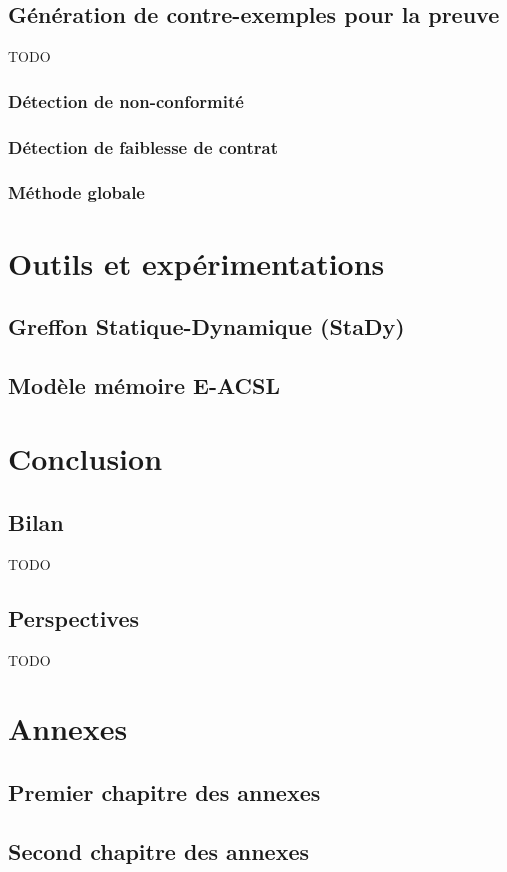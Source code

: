 \documentclass[french]{spimufcphdthesis}
\begin{document}
\chapter{Génération de contre-exemples pour la preuve}

TODO

\section{Détection de non-conformité}
\section{Détection de faiblesse de contrat}
\section{Méthode globale}





\part{Outils et expérimentations}


\chapter{Greffon Statique-Dynamique (StaDy)}
\label{sec:stady}



\chapter{Modèle mémoire E-ACSL}
\label{sec:eacsl}



\part{Conclusion}


\chapter{Bilan}


TODO


\chapter{Perspectives}


TODO



\backmatter




\listoffigures
\listoftables
\listofdefinitions

\appendix
\part{Annexes}

\chapter{Premier chapitre des annexes}
\chapter{Second chapitre des annexes}
\end{document}
